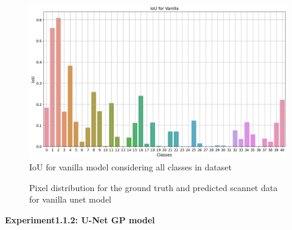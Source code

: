 	\begin{figure}
		\centering
		\includegraphics[width=13cm]{images/iou_vanilla_scannet_all_classes.png}
		\caption{IoU for vanilla model considering all classes in dataset}
		\label{fig:scannet_class}
	\end{figure} 

	\begin{figure}%
		\centering
		\qquad
		\caption{Pixel distribution for the ground truth and predicted scannet data for vanilla unet model}%
		\label{fig:y_gt_pred_vanilla}%
	\end{figure}
    { \bf Experiment1.1.2: U-Net GP model}
    
